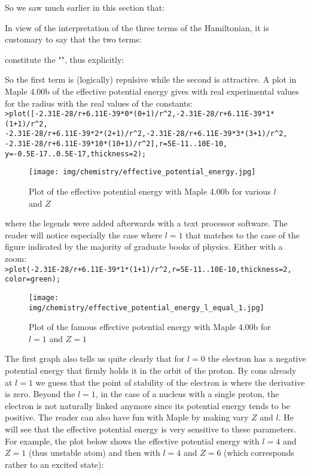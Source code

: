 	So we saw much earlier in this section that:
	
	In view of the interpretation of the three terms of the Hamiltonian, it is customary to say that the two terms:
	
	constitute the "", thus explicitly:
	
	So the first term is (logically) repulsive while the second is attractive. A plot in Maple 4.00b of the effective potential energy gives with real experimental values for the radius with the real values of the constants:\\
	
	\texttt{>plot([-2.31E-28/r+6.11E-39*0*(0+1)/r\string^2,-2.31E-28/r+6.11E-39*1*(1+1)/r\string^2,\\-2.31E-28/r+6.11E-39*2*(2+1)/r\string^2,-2.31E-28/r+6.11E-39*3*(3+1)/r\string^2,\\-2.31E-28/r+6.11E-39*10*(10+1)/r\string^2],r=5E-11..10E-10,\\y=-0.5E-17..0.5E-17,thickness=2);}
	\begin{figure}[H]
		\begin{center}
		\texttt{[image: img/chemistry/effective\_potential\_energy.jpg]}
		\end{center}	
		\caption{Plot of the effective potential energy with Maple 4.00b for various $l$ and $Z$}
	\end{figure}
	where the legends were added afterwards with a text processor software. The reader will notice especially the case where $l=1$ that matches to the case of the figure indicated by the majority of graduate books of physics. Either with a zoom:\\

	\texttt{>plot(-2.31E-28/r+6.11E-39*1*(1+1)/r\string^2,r=5E-11..10E-10,thickness=2, color=green);}
	\begin{figure}[H]
		\begin{center}
		\texttt{[image: img/chemistry/effective\_potential\_energy\_l\_equal\_1.jpg]}
		\end{center}	
		\caption{Plot of the famous effective potential energy with Maple 4.00b for  $l=1$ and $Z=1$}
	\end{figure}

	The first graph also tells us quite clearly that for $l= 0$ the electron has a negative potential energy that firmly holds it in the orbit of the proton. By cons already at $l= 1$ we guess that the point of stability of the electron is where the derivative is zero. Beyond the $l= 1$, in the case of a nucleus with a single proton, the electron is not naturally linked anymore since its potential energy tends to be positive. The reader can also have fun with Maple by making vary $Z$ and $l$. He will see that the effective potential energy is very sensitive to these parameters. For example, the plot below shows the effective potential energy with $l= 4$ and $Z = 1$ (thus unstable atom) and then with $l = 4$ and $Z = 6$ (which corresponds rather to an excited state):\\

